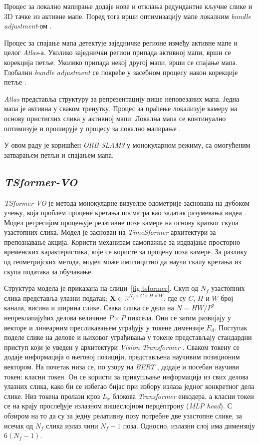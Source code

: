 \documentclass[12pt]{article}
\begin{document}
Процес за локално мапирање додаје нове и отклања редундантне кључне слике и 3D
тачке из активне мапе. Поред тога врши оптимизацију мапе локалним
\textit{bundle adjustment}-ом \cite{campos2021orbslam3}.

Процес за спајање мапа детектује заједничке регионе између активне мапе и целог
\textit{Atlas}-а. Уколико заједнички регион припада активној мапи, врши се
корекција петље. Уколико припада некој другој мапи, врши се спајање мапа.
Глобални \textit{bundle adjustment} се покреће у засебном процесу након
корекције петље \cite{campos2021orbslam3}.

\textit{Atlas} представља структуру за репрезентацију више неповезаних мапа.
Једна мапа је активна у сваком тренутку. Процес за праћење локализује камеру на
основу пристиглих слика у активној мапи. Локална мапа се континуално оптимизује
и проширује у процесу за локално мапирање \cite{campos2021orbslam3}.

У овом раду је коришћен \textit{ORB-SLAM3} у монокуларном режиму, са омогућеним
затварањем петљи и спајањем мапа.

\newpage
\subsection{\textit{TSformer-VO}}

\textit{TSformer-VO} је метода монокуларне визуелне одометрије заснована на
дубоком учењу, која проблем процене кретања посматра као задатак разумевања
видеа \cite{Francani2025}. Модел регресијом процењује релативне позе камере на
основу кратког скупа узастопних слика. Модел је заснован на
\textit{TimeSformer} архитектури за препознавање акција. Користи механизам
самопажње за издвајање просторно-временских карактеристика, које се користе за
процену поза камере. За разлику од геометријских метода, модел може имплицитно
да научи скалу кретања из скупа података за обучавање.

Структура модела је приказана на слици~\ref{fig:tsformer}. Скуп од $N_f$
узастопних слика представља улазни податак: $\mathbf{X} \in \mathbb{R}^{N_f
		\times C \times H \times W}$, где су $C$, $H$ и $W$ број канала, висина и
ширина слике. Свака слика се дели на $N = HW/P^2$ непреклапајућих делова
величине $P \times P$ пиксела. Они се затим развијају у векторе и линеарним
пресликавањем уграђују у токене димензије $E_d$. Поступак поделе слике на
делове и њиховог уграђивања у токене представљају стандардни приступ који је
уведен у архитектури \textit{Vision Transformer} \cite{dosovitskiy2021vit}.
Сваком токену се додаје информација о његовој позицији, представљена научивим
позиционим вектором. На почетак низа се, по узору на \textit{BERT}
\cite{devlin2019bert}, додаје и посебан научиви токен: класни токен. Он се
користи за прикупљање информација из свих делова улазних слика, како би се
избегао бијас при избору излаза једног конкретног дела слике. Низ токена
пролази кроз $L_x$ блокова \textit{Transformer} енкодера, а класни токен се на
крају прослеђује излазном вишеслојном перцептрону (\textit{MLP head}). С
обзиром на то да су за једну релативну позу потребне две узастопне слике, за
исечак од $N_f$ слика излаз чини $N_f - 1$ поза. Односно, излазни слој има
димензију $6(N_f - 1)$.
\end{document}
